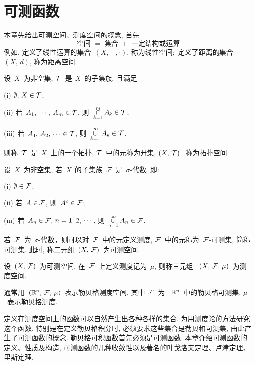 \chapter{可测函数}

本章先给出可测空间、测度空间的概念, 首先
\[
\mbox{空间~} = \mbox{~集合~} + \mbox{~一定结构或运算}
\]
例如, 定义了线性运算的集合~$(X,\,+,\cdot)$, 称为线性空间;\
定义了距离的集合~$(X,\,d)$, 称为距离空间.

\begin{example}
设~$X$~为非空集, $\mathcal{T}$~是~$X$~的子集族, 且满足

(i) $\emptyset, \, X \in \mathcal{T}$;

(ii) 若~$A_1,\,\cdots,\,A_m \in \mathcal{T}$, 则~$\mathop{\cap}\limits_{k=1}^m A_k \in \mathcal{T}$;

(iii) 若~$A_1,\,A_2,\,\cdots \in \mathcal{T}$, 则~$\mathop{\cup}\limits_{k=1}^\infty A_k \in \mathcal{T}$.

\noindent 则称~$\mathcal{T}$~是~$X$~上的一个拓扑, $\mathcal{T}$~中的元称为开集, $(X,\,\mathcal{T})$~
称为拓扑空间.
\end{example}

\begin{definition}
设~$X$~为非空集, 若~$X$~的子集族~$\mathcal{F}$~是~$\sigma$-代数, 即:

(i) $\emptyset \in \mathcal{F}$;

(ii) 若~$A \in \mathcal{F}$, 则~$A^c \in \mathcal{F}$;

(iii) 若~$A_n \in \mathcal{F}, \, n = 1,\,2,\,\cdots$, 则~$\mathop{\cup}
\limits_{n = 1}^\infty A_n \in \mathcal{F}$.

\noindent 若~$\mathcal{F}$~为~$\sigma$-代数，则可以对~$\mathcal{F}$~中的元定义测度, $\mathcal{F}$~中的元称为~$\mathcal{F}$-可测集,
简称可测集. 此时, 称二元组~$(X,\,\mathcal{F})$~为可测空间\index{可测空间}.
\end{definition}

\begin{definition}
设~$(X,\,\mathcal{F})$~为可测空间, 在~$\mathcal{F}$~上定义测度记为~$\mu$, 则称三元组
~$(X,\,\mathcal{F},\,\mu)$~为测度空间.
\end{definition}

通常用~$(\mathbb{R}^n,\,\mathcal{F},\,\mu)$~表示勒贝格测度空间, 其中~$\mathcal{F}$~为
~$\mathbb{R}^n$~中的勒贝格可测集, $\mu$~表示勒贝格测度.

定义在测度空间上的函数可以自然产生出各种各样的集合. 为用测度论的方法研究这个函数, 特别是在定义勒贝格积分时, 必须要求这些集合是勒贝格可测集, 由此产生了可测函数的概念. 勒贝格可积函数首先必须是可测函数. 本章介绍可测函数的定义、性质及构造, 可测函数的几种收敛性以及著名的叶戈洛夫定理、卢津定理、里斯定理.

